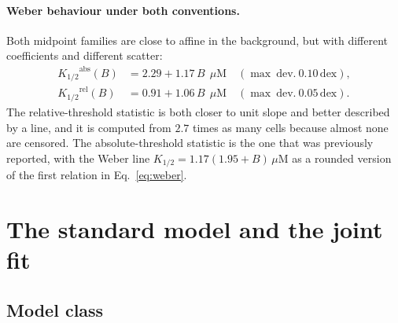 ﻿\documentclass[11pt,a4paper]{article}
\newcommand{\dex}{\ensuremath{\,\mathrm{dex}}}
\newcommand{\Khalf}{\ensuremath{K_{1/2}}}
\begin{document}
\paragraph{Weber behaviour under both conventions.} Both midpoint families are close to affine in the
background, but with different coefficients and different scatter:
\begin{equation}
\begin{aligned}
\Khalf^{\mathrm{abs}}(B) &= 2.29 + 1.17\,B\ \ \mu\mathrm{M}\quad(\max\ \mathrm{dev.}\ 0.10\dex),\\
\Khalf^{\mathrm{rel}}(B) &= 0.91 + 1.06\,B\ \ \mu\mathrm{M}\quad(\max\ \mathrm{dev.}\ 0.05\dex).
\end{aligned}
\label{eq:weber}
\end{equation}
The relative-threshold statistic is both closer to unit slope and better described by a line, and it
is computed from $2.7$ times as many cells because almost none are censored. The absolute-threshold
statistic is the one that was previously reported, with the Weber line
$\Khalf=1.17(1.95+B)\,\mu$M as a rounded version of the first relation in Eq.~\eqref{eq:weber}.

\section{The standard model and the joint fit}
\label{sec:model}

\subsection{Model class}
\end{document}
